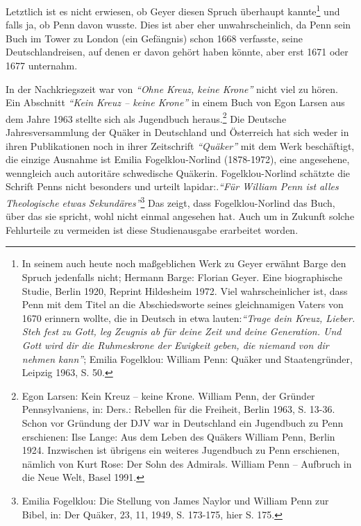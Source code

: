 Letztlich ist es nicht erwiesen, ob Geyer diesen Spruch überhaupt
kannte\footnote{In seinem auch heute noch maßgeblichen Werk zu Geyer erwähnt
Barge den
Spruch jedenfalls nicht; Hermann Barge: Florian Geyer. Eine biographische
Studie, Berlin 1920, Reprint Hildesheim 1972. Viel wahrscheinlicher ist, dass
Penn mit dem Titel an die Abschiedsworte seines gleichnamigen Vaters von 1670
erinnern wollte, die in Deutsch in etwa lauten:\textit{"`Trage dein Kreuz, Lieber. Steh
fest zu Gott, leg Zeugnis ab für deine Zeit und deine Generation. Und Gott wird
dir die Ruhmeskrone der Ewigkeit geben, die niemand von dir nehmen kann"'}; 
Emilia Fogelklou: William Penn: Quäker und Staatengründer, Leipzig 1963, S. 50.}
und falls ja, ob Penn davon wusste. Dies ist aber eher unwahrscheinlich, da Penn
sein Buch im Tower zu London (ein Gefängnis) schon 1668 verfasste, seine Deutschlandreisen, auf
denen er davon gehört haben könnte, aber erst 1671 oder 1677 unternahm.

\medskip

In der Nachkriegszeit war von \textit{"`Ohne Kreuz, keine Krone"'} nicht viel zu hören.
Ein Abschnitt \textit{"`Kein Kreuz -- keine Krone"'} in einem Buch von Egon Larsen aus
dem Jahre 1963 stellte sich als Jugendbuch heraus.\footnote{Egon Larsen: Kein
Kreuz -- keine Krone. William Penn, der Gründer
Pennsylvaniens, in: Ders.: Rebellen für die Freiheit, Berlin 1963, S. 13-36. Schon vor Gründung der DJV war in Deutschland ein Jugendbuch zu Penn erschienen: Ilse Lange: Aus dem Leben
des Quäkers William Penn, Berlin 1924. Inzwischen ist übrigens ein weiteres Jugendbuch zu Penn erschienen, nämlich von
Kurt Rose: Der Sohn des Admirals. William Penn -- Aufbruch in die Neue Welt,
Basel 1991.} Die Deutsche
Jahresversammlung der Quäker in Deutschland und Österreich hat sich weder in
ihren Publikationen noch in ihrer Zeitschrift \textit{"`Quäker"'} mit dem Werk beschäftigt,
die einzige Ausnahme ist Emilia Fogelklou-Norlind (1878-1972), eine angesehene,
wenngleich auch autoritäre schwedische Quäkerin. Fogelklou-Norlind schätzte die
Schrift Penns nicht besonders und urteilt lapidar:.\textit{"`Für William Penn ist alles
Theologische etwas Sekundäres"'}\footnote{Emilia Fogelklou: Die Stellung von
James Naylor und William Penn zur Bibel,
in: Der Quäker, 23, 11, 1949, S. 173-175, hier S. 175.} Das zeigt, dass
Fogelklou-Norlind das Buch, über das sie spricht, wohl nicht einmal angesehen
hat. Auch um in Zukunft solche Fehlurteile zu vermeiden ist diese Studienausgabe
erarbeitet worden.





